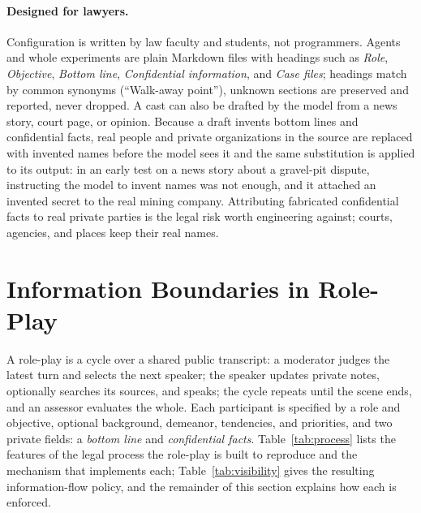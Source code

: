 \documentclass[acmsmall,screen,review]{acmart}
\begin{document}
\paragraph{Designed for lawyers.} Configuration is written by law faculty and students, not programmers. Agents and whole experiments are plain Markdown files with headings such as \emph{Role}, \emph{Objective}, \emph{Bottom line}, \emph{Confidential information}, and \emph{Case files}; headings match by common synonyms (``Walk-away point''), unknown sections are preserved and reported, never dropped. A cast can also be drafted by the model from a news story, court page, or opinion. Because a draft invents bottom lines and confidential facts, real people and private organizations in the source are replaced with invented names before the model sees it and the same substitution is applied to its output: in an early test on a news story about a gravel-pit dispute, instructing the model to invent names was not enough, and it attached an invented secret to the real mining company. Attributing fabricated confidential facts to real private parties is the legal risk worth engineering against; courts, agencies, and places keep their real names.

\section{Information Boundaries in Role-Play}
\label{sec:boundaries}

A role-play is a cycle over a shared public transcript: a moderator judges the latest turn and selects the next speaker; the speaker updates private notes, optionally searches its sources, and speaks; the cycle repeats until the scene ends, and an assessor evaluates the whole. Each participant is specified by a role and objective, optional background, demeanor, tendencies, and priorities, and two private fields: a \emph{bottom line} and \emph{confidential facts}. Table~\ref{tab:process} lists the features of the legal process the role-play is built to reproduce and the mechanism that implements each; Table~\ref{tab:visibility} gives the resulting information-flow policy, and the remainder of this section explains how each is enforced.
\end{document}
